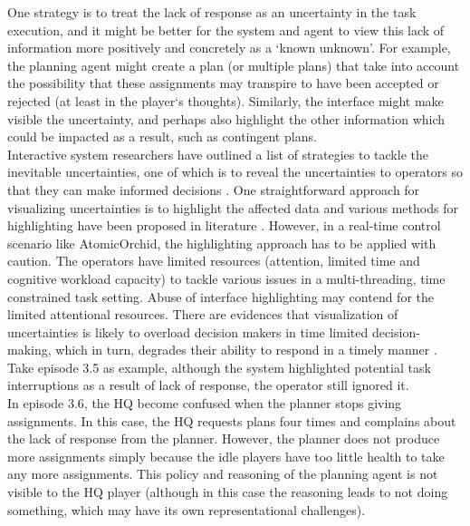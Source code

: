 One strategy is to treat the lack of response as an uncertainty in the task execution, and it might be better for the system and agent to view this lack of information more positively and concretely as a `known unknown'. For example, the planning agent might create a plan (or multiple plans) that take into account the possibility that these assignments may transpire to have been accepted or rejected (at least in the player`s thoughts). Similarly, the interface might make visible the uncertainty, and perhaps also highlight the other information which could be impacted as a result, such as contingent plans. \\

Interactive system researchers have outlined a list of strategies to tackle the inevitable uncertainties, one of which is to reveal the uncertainties to operators so that they can make informed decisions \citep{Benford2006,Skeels2008}. One straightforward approach for visualizing uncertainties is to highlight the affected data and various methods for highlighting have been proposed in literature \citep{Conti2006}. However, in a real-time control scenario like AtomicOrchid, the highlighting approach has to be applied with caution.  The operators have limited resources (attention, limited time and cognitive workload capacity) to tackle various issues in a multi-threading, time constrained task setting. Abuse of interface highlighting may contend for the limited attentional resources. There are evidences that visualization of uncertainties is likely to overload decision makers in time limited decision-making, which in turn, degrades their ability to respond in a timely manner \citep{Zuk2007}. Take episode 3.5 as example, although the system highlighted potential task interruptions as a result of lack of response, the operator still ignored it. \\

In episode 3.6, the HQ  become confused when the planner stops giving assignments. In this case, the HQ requests plans four times and complains about the lack of response from the planner. However, the planner does not produce more assignments simply because the idle players have too little health to take any more assignments. This policy and reasoning of the planning agent is not visible to the HQ player (although in this case the reasoning leads to not doing something, which may have its own representational challenges). \\

